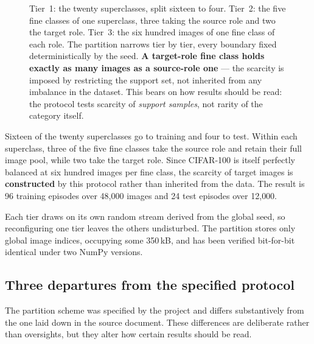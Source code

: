 \documentclass[11pt]{article}
\begin{document}
\begin{figure}[htbp]
\caption{Tier~1: the twenty superclasses, split sixteen to four. Tier~2: the five fine classes of
one superclass, three taking the source role and two the target role. Tier~3: the six hundred images
of one fine class of each role. The partition narrows tier by tier, every boundary fixed
deterministically by the seed.
\textbf{A target-role fine class holds exactly as many images as a source-role one} --- the scarcity
is imposed by restricting the support set, not inherited from any imbalance in the dataset. This
bears on how results should be read: the protocol tests scarcity of \emph{support samples}, not
rarity of the category itself.}
\label{fig:split}
\end{figure}

Sixteen of the twenty superclasses go to training and four to test. Within each superclass, three of
the five fine classes take the source role and retain their full image pool, while two take the
target role. Since CIFAR-100 is itself perfectly balanced at six hundred images per fine class, the
scarcity of target images is \textbf{constructed} by this protocol rather than inherited from the
data. The result is 96 training episodes over 48{,}000 images and 24 test episodes over 12{,}000.

Each tier draws on its own random stream derived from the global seed, so reconfiguring one tier
leaves the others undisturbed. The partition stores only global image indices, occupying some
350\,kB, and has been verified bit-for-bit identical under two NumPy versions.

\subsection{Three departures from the specified protocol}
\label{sec:departures}

The partition scheme was specified by the project and differs substantively from the one laid down
in the source document. These differences are deliberate rather than oversights, but they alter how
certain results should be read.
\end{document}
